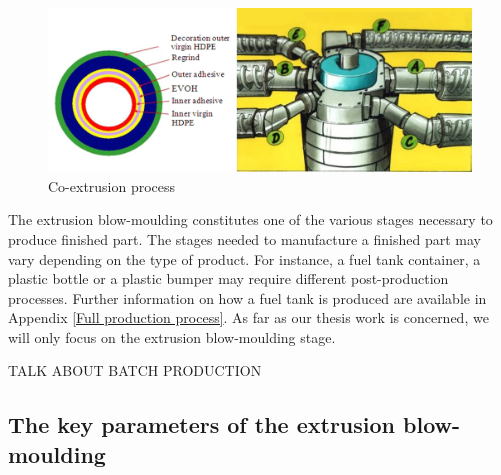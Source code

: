 \begin{figure}
\centerline{\includegraphics[scale=0.55]{images/chapter_1/coextrusion.png}}
\caption{Co-extrusion process}
\label{fig:Co-extrusion Process}
\end{figure}

The extrusion blow-moulding constitutes one of the various stages necessary to produce finished part. The stages needed to manufacture a finished part may vary depending on the type of product. For instance, a fuel tank container, a plastic bottle or a plastic bumper may require different post-production processes. Further information on how a fuel tank is produced are available in Appendix \ref{Full production process}. As far as our thesis work is concerned, we will only focus on the extrusion blow-moulding stage.

TALK ABOUT BATCH PRODUCTION


\subsection{The key parameters of the extrusion blow-moulding} \label{The key parameters of the Extrusion Blow-moulding}


